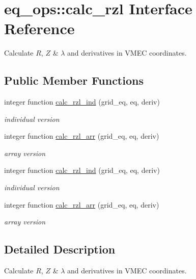 \hypertarget{interfaceeq__ops_1_1calc__rzl}{}\section{eq\+\_\+ops\+:\+:calc\+\_\+rzl Interface Reference}
\label{interfaceeq__ops_1_1calc__rzl}


Calculate $R$, $Z$ \& $\lambda$ and derivatives in V\+M\+EC coordinates.  


\subsection*{Public Member Functions}
\begin{DoxyCompactItemize}
\item 
integer function \hyperlink{interfaceeq__ops_1_1calc__rzl_ac161b0609f9e3748553befd2d62d083c}{calc\+\_\+rzl\+\_\+ind} (grid\+\_\+eq, eq, deriv)
\begin{DoxyCompactList}\small\item\em individual version \end{DoxyCompactList}\item 
integer function \hyperlink{interfaceeq__ops_1_1calc__rzl_ab117adebbc8a50ce2ef9c9dfa96674bb}{calc\+\_\+rzl\+\_\+arr} (grid\+\_\+eq, eq, deriv)
\begin{DoxyCompactList}\small\item\em array version \end{DoxyCompactList}\item 
integer function \hyperlink{interfaceeq__ops_1_1calc__rzl_ac161b0609f9e3748553befd2d62d083c}{calc\+\_\+rzl\+\_\+ind} (grid\+\_\+eq, eq, deriv)
\begin{DoxyCompactList}\small\item\em individual version \end{DoxyCompactList}\item 
integer function \hyperlink{interfaceeq__ops_1_1calc__rzl_ab117adebbc8a50ce2ef9c9dfa96674bb}{calc\+\_\+rzl\+\_\+arr} (grid\+\_\+eq, eq, deriv)
\begin{DoxyCompactList}\small\item\em array version \end{DoxyCompactList}\end{DoxyCompactItemize}


\subsection{Detailed Description}
Calculate $R$, $Z$ \& $\lambda$ and derivatives in V\+M\+EC coordinates. 

